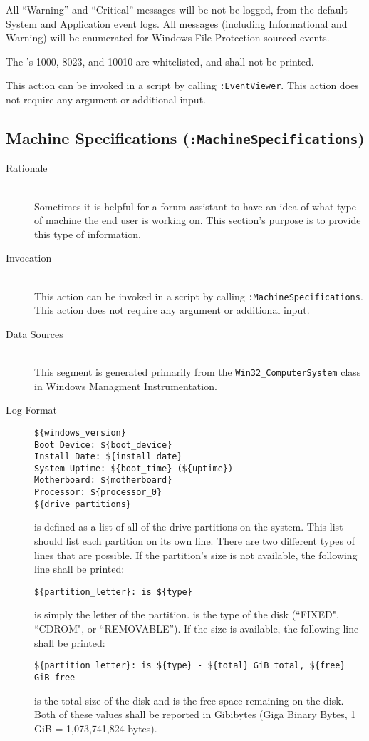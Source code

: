 All ``Warning'' and ``Critical'' messages will be not be logged, from the
default System and Application event logs. All messages (including Informational
and Warning) will be enumerated for Windows File Protection sourced events.

The 's 1000, 8023, and 10010 are whitelisted, and shall not be
printed.

This action can be invoked in a script by calling \verb|:EventViewer|.
This action does not require any argument or additional input.

\subsection{Machine Specifications (\texttt{:MachineSpecifications})}
\begin{description}
\item[Rationale] \hfill \\
Sometimes it is helpful for a forum assistant to have an idea of what type of
machine the end user is working on.  This section's purpose is to provide this
type of information.
\item[Invocation] \hfill \\
This action can be invoked in a script by calling \verb|:MachineSpecifications|.
This action does not require any argument or additional input.
\item[Data Sources] \hfill \\
This segment is generated primarily from the \verb|Win32_ComputerSystem| class
in Windows Managment Instrumentation.
\item[Log Format] \hfill 
\vspace{-\baselineskip}
\begin{verbatim}
${windows_version}
Boot Device: ${boot_device}
Install Date: ${install_date}
System Uptime: ${boot_time} (${uptime})
Motherboard: ${motherboard}
Processor: ${processor_0}
${drive_partitions}
\end{verbatim}
 is defined as a list of all of the drive partitions
on the system.  This list should list each partition on its own line.  There are
two different types of lines that are possible.  If the partition's size is not
available, the following line shall be printed:
\vspace{-\baselineskip}
\begin{verbatim}
${partition_letter}: is ${type}
\end{verbatim}
 is simply the letter of the partition.   is
the type of the disk (``FIXED", ``CDROM", or ``REMOVABLE'').  If the size is
available, the following line shall be printed:
\vspace{-\baselineskip}
\begin{verbatim}
${partition_letter}: is ${type} - ${total} GiB total, ${free} GiB free
\end{verbatim}
 is the total size of the disk and  is the free space
remaining on the disk.  Both of these values shall be reported in Gibibytes
(Giga Binary Bytes, 1 GiB = 1,073,741,824 bytes).


\end{description}
